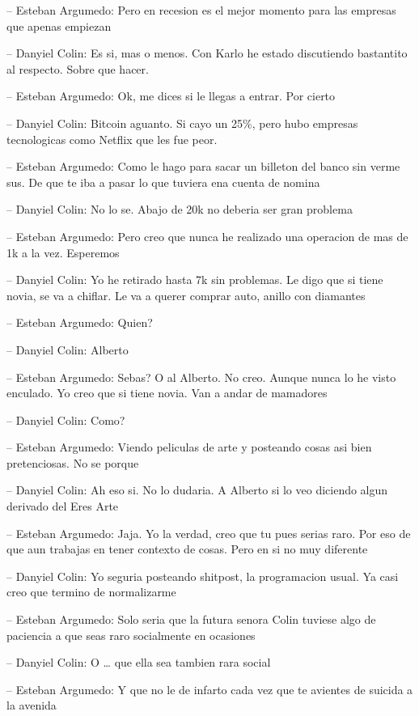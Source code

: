 -- Esteban Argumedo: Pero en recesion es el mejor momento para las
empresas que apenas empiezan

-- Danyiel Colin: Es si, mas o menos. Con Karlo he estado discutiendo
bastantito al respecto. Sobre que hacer.

-- Esteban Argumedo: Ok, me dices si le llegas a entrar. Por cierto

-- Danyiel Colin: Bitcoin aguanto. Si cayo un 25\%, pero hubo empresas
tecnologicas como Netflix que les fue peor.

-- Esteban Argumedo: Como le hago para sacar un billeton del banco sin
verme sus. De que te iba a pasar lo que tuviera ena cuenta de nomina

-- Danyiel Colin: No lo se. Abajo de 20k no deberia ser gran problema

-- Esteban Argumedo: Pero creo que nunca he realizado una operacion de
mas de 1k a la vez. Esperemos

-- Danyiel Colin: Yo he retirado hasta 7k sin problemas. Le digo que si
tiene novia, se va a chiflar. Le va a querer comprar auto, anillo con
diamantes

-- Esteban Argumedo: Quien?

-- Danyiel Colin: Alberto

-- Esteban Argumedo: Sebas? O al Alberto. No creo. Aunque nunca lo he
visto enculado. Yo creo que si tiene novia. Van a andar de mamadores

-- Danyiel Colin: Como?

-- Esteban Argumedo: Viendo peliculas de arte y posteando cosas asi bien
pretenciosas. No se porque

-- Danyiel Colin: Ah eso si. No lo dudaria. A Alberto si lo veo diciendo
algun derivado del Eres Arte

-- Esteban Argumedo: Jaja. Yo la verdad, creo que tu pues serias raro.
Por eso de que aun trabajas en tener contexto de cosas. Pero en si no
muy diferente

-- Danyiel Colin: Yo seguria posteando shitpost, la programacion usual.
Ya casi creo que termino de normalizarme

-- Esteban Argumedo: Solo seria que la futura senora Colin tuviese algo
de paciencia a que seas raro socialmente en ocasiones

-- Danyiel Colin: O \ldots{} que ella sea tambien rara social

-- Esteban Argumedo: Y que no le de infarto cada vez que te avientes de
suicida a la avenida

